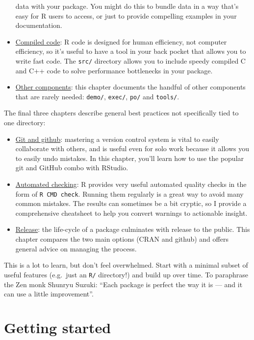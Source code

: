 \documentclass[]{book}
\begin{document}
\begin{itemize}
  data with your package. You might do this to bundle data
  in a way that's easy for R users to access, or just to provide compelling
  examples in your documentation.
\item
  \protect\hyperlink{src}{Compiled code}: R code is designed for human efficiency, not computer
  efficiency, so it's useful to have a tool in your back pocket that allows you
  to write fast code. The \texttt{src/} directory allows you to include speedy
  compiled C and C++ code to solve performance bottlenecks in your package.
\item
  \protect\hyperlink{misc}{Other components}: this chapter documents the handful of other
  components that are rarely needed: \texttt{demo/}, \texttt{exec/}, \texttt{po/} and \texttt{tools/}.
\end{itemize}

The final three chapters describe general best practices not specifically tied to one directory:

\begin{itemize}
\item
  \protect\hyperlink{git}{Git and github}: mastering a version control system is vital to easily
  collaborate with others, and is useful even for solo work because it allows
  you to easily undo mistakes. In this chapter, you'll learn how to use the
  popular git and GitHub combo with RStudio.
\item
  \protect\hyperlink{check}{Automated checking}: R provides very useful automated quality checks
  in the form of \texttt{R\ CMD\ check}. Running them regularly is a great way to avoid
  many common mistakes. The results can sometimes be a bit cryptic, so I
  provide a comprehensive cheatsheet to help you convert warnings to
  actionable insight.
\item
  \protect\hyperlink{release}{Release}: the life-cycle of a package culminates with release
  to the public. This chapter compares the two main options (CRAN and github)
  and offers general advice on managing the process.
\end{itemize}

This is a lot to learn, but don't feel overwhelmed. Start with a minimal subset of useful features (e.g.~just an \texttt{R/} directory!) and build up over time. To paraphrase the Zen monk Shunryu Suzuki: ``Each package is perfect the way it is --- and it can use a little improvement''.

\hypertarget{intro-get}{%
\section{Getting started}\label{intro-get}}
\end{document}
